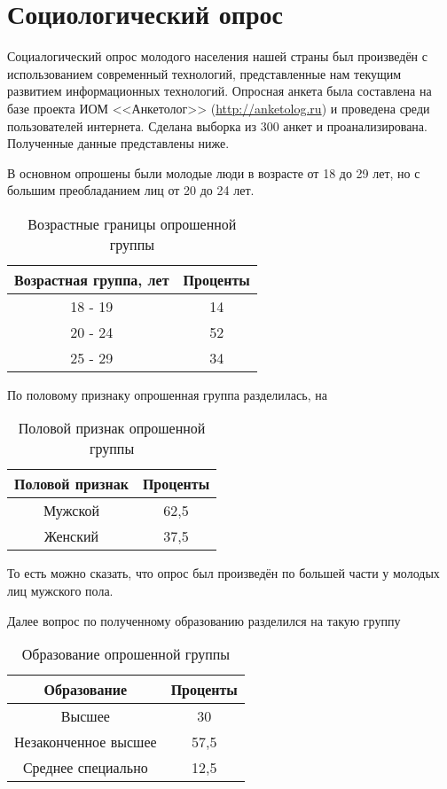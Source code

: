 \section{Социологический опрос}

Социалогический опрос молодого населения нашей страны был произведён с 
использованием современный технологий, представленные нам текущим развитием 
информационных технологий. Опросная анкета была составлена на базе проекта 
ИОМ <<Анкетолог>> (\url{http://anketolog.ru}) и проведена среди пользователей 
интернета. Сделана выборка из 300 анкет и проанализирована. Полученные данные 
представлены ниже.

В основном опрошены были молодые люди в возрасте от 18 до 29 лет, но с большим 
преобладанием лиц от 20 до 24 лет.

\begin{table}[H]
    \centering
    \begin{tabular}{|c|c|}
        \hline
        Возрастная группа, лет & Проценты \\ \hline \hline
        18 - 19 & 14 \\ \hline
        20 - 24 & 52 \\ \hline
        25 - 29 & 34 \\ \hline
    \end{tabular}
    \caption{Возрастные границы опрошенной группы}
    \label{table:01}
\end{table}

По половому признаку опрошенная группа разделилась, на 
\begin{table}[H]
    \centering
    \begin{tabular}{|c|c|}
        \hline
        Половой признак & Проценты \\ \hline \hline
        Мужской & 62,5 \\ \hline
        Женский & 37,5 \\ \hline
    \end{tabular}
    \caption{Половой признак опрошенной группы}
\end{table}

То есть можно сказать, что опрос был произведён по большей части у молодых 
лиц мужского пола.

Далее вопрос по полученному образованию разделился на такую группу
\begin{table}[H]
    \centering
    \begin{tabular}{|c|c|}
        \hline
        Образование & Проценты \\ \hline \hline
        Высшее & 30 \\ \hline
        Незаконченное высшее & 57,5 \\ \hline
        Среднее специально & 12,5 \\ \hline
    \end{tabular}
    \caption{Образование опрошенной группы}
\end{table}

